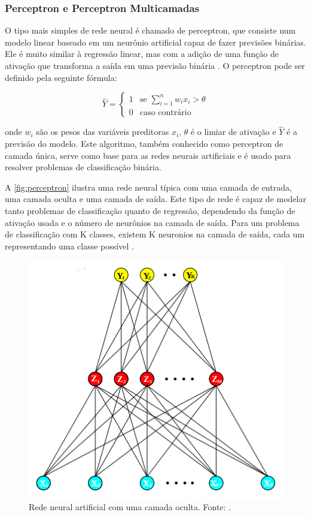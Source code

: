 \subsubsection{Perceptron e Perceptron Multicamadas}


O tipo mais simples de rede neural é chamado de perceptron, que consiste num modelo linear baseado em um neurônio artificial capaz de fazer previsões binárias. Ele é muito similar à regressão linear, mas com a adição de uma função de ativação que transforma a saída em uma previsão binária \citep{James2000}. O perceptron pode ser definido pela seguinte fórmula:

\begin{equation}
    \hat{Y} = 
    \begin{cases}
        1 & \text{se } \sum_{i=1}^{n} w_i x_i > \theta \\
        0 & \text{caso contrário}
    \end{cases}
\end{equation}

onde $w_i$ são os pesos das variáveis preditoras $x_i$, $\theta$ é o limiar de ativação e $\hat{Y}$ é a previsão do modelo. Este algoritmo, também conhecido como perceptron de camada única, serve como base para as redes neurais artificiais e é usado para resolver problemas de classificação binária.

A \autoref{fig:perceptron} ilustra uma rede neural típica com uma camada de entrada, uma camada oculta e uma camada de saída. Este tipo de rede é capaz de modelar tanto problemas de classificação quanto de regressão, dependendo da função de ativação usada e o número de neurônios na camada de saída. Para um problema de classificação com K classes, existem K neuronios na camada de saída, cada um representando uma classe possível \citep{James2000}.

\begin{figure}
    \centering
    \includegraphics[width=0.5\linewidth]{figs/perceptron-network.png}
    \caption{Rede neural artificial com uma camada oculta. Fonte: \cite{James2000}.}
    \label{fig:perceptron}
\end{figure}

